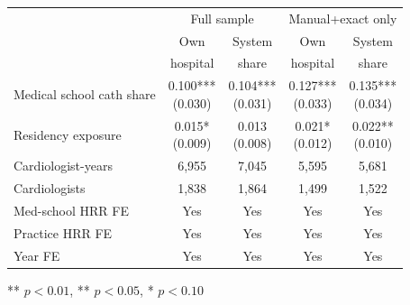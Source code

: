 \begin{threeparttable}
\begin{tabular}{lcccc}
\toprule
 & \multicolumn{2}{c}{Full sample} & \multicolumn{2}{c}{Manual+exact only} \\
\cmidrule(lr){2-3} \cmidrule(lr){4-5}
 & Own & System & Own & System \\
 & hospital & share & hospital & share \\
\midrule
Medical school cath share & \shortstack[c]{0.100*** \\ (0.030)} & \shortstack[c]{0.104*** \\ (0.031)} & \shortstack[c]{0.127*** \\ (0.033)} & \shortstack[c]{0.135*** \\ (0.034)} \\
Residency exposure & \shortstack[c]{0.015* \\ (0.009)} & \shortstack[c]{0.013 \\ (0.008)} & \shortstack[c]{0.021* \\ (0.012)} & \shortstack[c]{0.022** \\ (0.010)} \\
\midrule
Cardiologist-years & 6,955 & 7,045 & 5,595 & 5,681 \\
Cardiologists & 1,838 & 1,864 & 1,499 & 1,522 \\
Med-school HRR FE & Yes & Yes & Yes & Yes \\
Practice HRR FE & Yes & Yes & Yes & Yes \\
Year FE & Yes & Yes & Yes & Yes \\
\bottomrule
\end{tabular}
\begin{tablenotes}[flushleft]
\footnotesize
\item *** $p < 0.01$, ** $p < 0.05$, * $p < 0.10$
\end{tablenotes}
\end{threeparttable}
